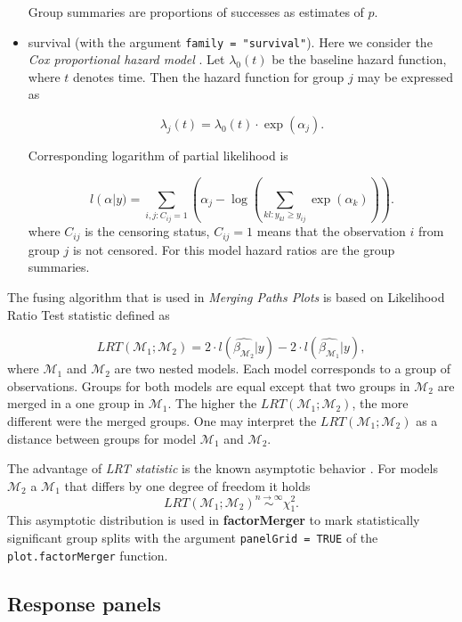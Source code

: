 \documentclass[12pt]{article}
\newcommand{\factorMerger}{\textbf{factorMerger }}
\newcommand{\M}{\mathcal{M}}
\newcommand{\code}{\texttt}
\begin{document}
\begin{itemize}
Group summaries are proportions of successes as estimates of $p$.

\item survival (with the argument \code{family = "survival"}). Here we consider the \emph{Cox proportional hazard model} \citep{coxph}.
Let $\lambda_0(t)$ be the baseline hazard function, where $t$ denotes time. Then the hazard function for group $j$ may be expressed as

$$
\lambda_j(t) = 
\lambda_0(t)\cdot \exp(\alpha_j).
$$

Corresponding logarithm of partial likelihood is

$$
l\left(\alpha\right|y) = 
	\sum_{i,j:C_{ij} = 1} 
		\left(
			\alpha_j -
			\log{
				\left(
				\sum_{kl:y_{kl}\geq y_{ij}} 
				\exp{\left(\alpha_k\right)}		
				\right)
			}
		\right).
$$
where $C_{ij}$ is the censoring status, $C_{ij} = 1$ means that the observation $i$ from group $j$ is not censored.
For this model hazard ratios are the group summaries.

\end{itemize}

The fusing algorithm that is used in \emph{Merging Paths Plots} is based on Likelihood Ratio Test statistic defined as

\begin{equation} \label{LRTstat}
LRT(\M_1;\M_2) = 2 \cdot l (\widehat{\beta_{\M_2}}|y) - 2 \cdot l (\widehat{\beta_{\M_1}}|y),
\end{equation}
where $\mathcal{M}_1$ and $\mathcal{M}_2$ are two nested models. Each model corresponds to a group of observations. Groups for both models are equal except that two groups in $\M_2$ are merged in a one group in $\M_1$.
The higher the $LRT(\M_1;\M_2)$, the more different were the merged groups. One may interpret the $LRT(\M_1;\M_2)$ as a distance between groups for model $\M_1$ and $\M_2$.

The advantage of \emph{LRT statistic} is the known asymptotic behavior \citep[see]{wilks1938large}. For models $\M_2$ a $\M_1$ that differs by one degree of freedom it holds
$$
LRT(\M_1;\M_2) \overset{n \rightarrow \infty}{\sim} \chi^2_1.
$$
This asymptotic distribution is used in \factorMerger to mark statistically significant group splits with the argument \code{panelGrid = TRUE} of the \code{plot.factorMerger} function. 

\subsection{Response panels}
\end{document}
